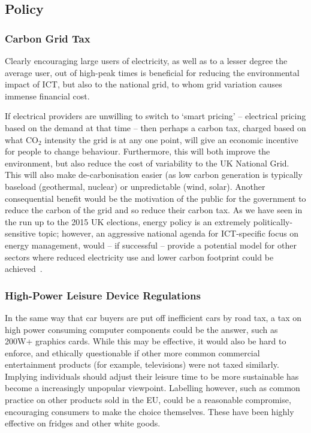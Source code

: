 \documentclass[conference]{IEEEtran}
\begin{document}
\subsection{Policy}

\subsubsection{Carbon Grid Tax}

Clearly encouraging large users of electricity, as well as to a lesser
degree the average user, out of high-peak times is beneficial for
reducing the environmental impact of ICT, but also to the national
grid, to whom grid variation causes immense financial cost.

If electrical providers are unwilling to switch to `smart pricing' --
electrical pricing based on the demand at that time -- then perhaps a
carbon tax, charged based on what CO$_2$ intensity the grid is at any
one point, will give an economic incentive for people to change
behaviour. Furthermore, this will both improve the environment, but
also reduce the cost of variability to the UK National Grid. This will
also make de-carbonisation easier (as low carbon generation is
typically baseload (geothermal, nuclear) or unpredictable (wind,
solar). Another consequential benefit would be the motivation of the
public for the government to reduce the carbon of the grid and so
reduce their carbon tax. As we have seen in the run up to the 2015 UK
elections, energy policy is an extremely politically-sensitive topic;
however, an aggressive national agenda for ICT-specific focus on
energy management, would -- if successful -- provide a potential model
for other sectors where reduced electricity use and lower carbon
footprint could be achieved~\cite{smart2020:2008,ruth:2011}.

\subsubsection{High-Power Leisure Device Regulations}

In the same way that car buyers are put off inefficient cars by road
tax, a tax on high power consuming computer components could be the
answer, such as 200W+ graphics cards. While this may be effective, it
would also be hard to enforce, and ethically questionable if other
more common commercial entertainment products (for example,
televisions) were not taxed similarly. Implying individuals should
adjust their leisure time to be more sustainable has become a
increasingly unpopular viewpoint. Labelling however, such as common
practice on other products sold in the EU, could be a reasonable
compromise, encouraging consumers to make the choice themselves. These
have been highly effective on fridges and other white goods.
\end{document}
